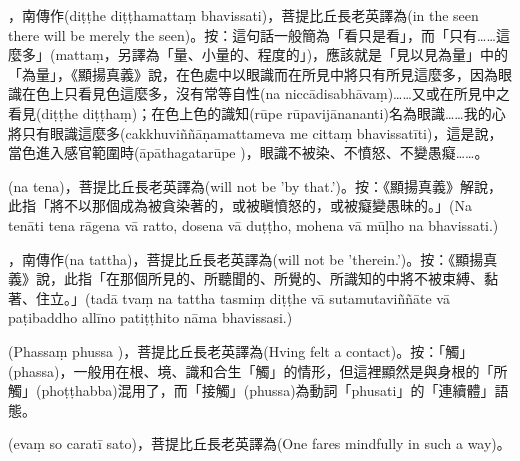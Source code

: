 \startitemgroup[noteitems]
\item{}，南傳作(diṭṭhe diṭṭhamattaṃ bhavissati)，菩提比丘長老英譯為(in the seen there will be merely the seen)。按：這句話一般簡為「看只是看」，而「只有……這麼多」(mattaṃ，另譯為「量、小量的、程度的」)，應該就是「見以見為量」中的「為量」，《顯揚真義》說，在色處中以眼識而在所見中將只有所見這麼多，因為眼識在色上只看見色這麼多，沒有常等自性(na niccādisabhāvaṃ)……又或在所見中之看見(diṭṭhe diṭṭhaṃ)；在色上色的識知(rūpe rūpavijānananti)名為眼識……我的心將只有眼識這麼多(cakkhuviññāṇamattameva me cittaṃ bhavissatīti)，這是說，當色進入感官範圍時(āpāthagatarūpe )，眼識不被染、不憤怒、不變愚癡……。
\stopitemgroup

\startitemgroup[noteitems]
\item{}(na tena)，菩提比丘長老英譯為(will not be 'by that.')。按：《顯揚真義》解說，此指「將不以那個成為被貪染著的，或被瞋憤怒的，或被癡變愚昧的。」(Na tenāti tena rāgena vā ratto, dosena vā duṭṭho, mohena vā mūḷho na bhavissati.)
\stopitemgroup

\startitemgroup[noteitems]
\item{}，南傳作(na tattha)，菩提比丘長老英譯為(will not be 'therein.')。按：《顯揚真義》說，此指「在那個所見的、所聽聞的、所覺的、所識知的中將不被束縛、黏著、住立。」(tadā tvaṃ na tattha tasmiṃ diṭṭhe vā sutamutaviññāte vā paṭibaddho allīno patiṭṭhito nāma bhavissasi.)
\stopitemgroup

\startitemgroup[noteitems]
\item{}(Phassaṃ phussa )，菩提比丘長老英譯為(Hving felt a contact)。按：「觸」(phassa)，一般用在根、境、識和合生「觸」的情形，但這裡顯然是與身根的「所觸」(phoṭṭhabba)混用了，而「接觸」(phussa)為動詞「phusati」的「連續體」語態。
\stopitemgroup

\startitemgroup[noteitems]
\item{}(evaṃ so caratī sato)，菩提比丘長老英譯為(One fares mindfully in such a way)。
\stopitemgroup

